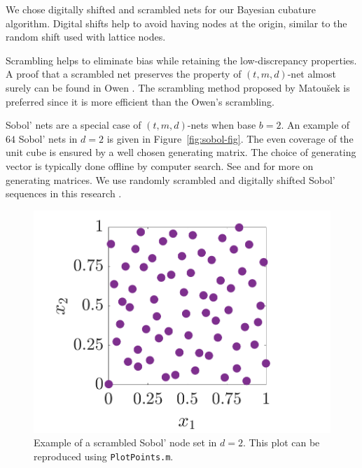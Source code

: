 \documentclass{svjour3}                     %
\newcommand{\bm}[1]{\boldsymbol{#1}}
\newcommand{\vx}{\bm{x}}
\newcommand{\vz}{\bm{z}}
\newcommand{\code}[1]{\texttt{#1}}
\newcommand\figref{Figure~\ref}
\newcommand{\JRNote}[1]{{\textcolor{green}{JR: #1}}}
\begin{document}
We chose digitally shifted and scrambled nets \cite{HicYue00} for our Bayesian cubature algorithm. Digital shifts help to avoid having nodes at the origin, similar to the random shift used with lattice nodes.

Scrambling helps to eliminate bias while retaining the low-discrepancy properties.
A proof that a scrambled net preserves the property of $(t, m, d)$-net almost surely can be found in Owen \cite{Owe95}. The scrambling method proposed by Matou\v{s}ek \cite{Mat98} is preferred since it is more efficient than the Owen's scrambling.

Sobol' nets \cite{Sob76} are a special case of $(t,m, d)$-nets when base $b=2$. 
An example of $64$ Sobol' nets in $d=2$ is given in \figref{fig:sobol-fig}.  The even coverage of the unit cube is ensured by a well chosen generating matrix.  The choice of generating vector is typically done offline by computer search.  See \cite{KuoNuyens2016} and \cite{NuySoft} for more on generating matrices. We use randomly scrambled and digitally shifted Sobol' sequences in this research \cite{HonHic00a}. 

\begin{figure}[htp]
	\label{fig:sobol-fig}
	\centering
	\includegraphics[width=0.8\linewidth]{figures/SSobolPoints}
	\caption{Example of a scrambled Sobol' node set  in $d=2$.  This plot can be reproduced using \code{PlotPoints.m}. \label{sobolfig} }
\end{figure}
\end{document}
